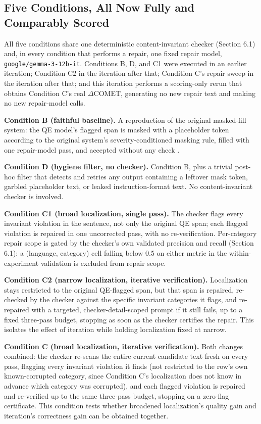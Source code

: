 \documentclass[11pt,letterpaper]{article}
\begin{document}
\subsection{Five Conditions, All Now Fully and Comparably Scored}

All five conditions share one deterministic content-invariant checker (Section 6.1) and, in every condition that performs a repair, one fixed repair model, \texttt{google/gemma-3-12b-it}. Conditions B, D, and C1 were executed in an earlier iteration; Condition C2 in the iteration after that; Condition C's repair sweep in the iteration after that; and this iteration performs a scoring-only rerun that obtains Condition C's real $\Delta$COMET, generating no new repair text and making no new repair-model calls.

\textbf{Condition B (faithful baseline).} A reproduction of the original masked-fill system: the QE model's flagged span is masked with a placeholder token according to the original system's severity-conditioned masking rule, filled with one repair-model pass, and accepted without any check \citep{Padmanabhan2025}.

\textbf{Condition D (hygiene filter, no checker).} Condition B, plus a trivial post-hoc filter that detects and retries any output containing a leftover mask token, garbled placeholder text, or leaked instruction-format text. No content-invariant checker is involved.

\textbf{Condition C1 (broad localization, single pass).} The checker flags every invariant violation in the sentence, not only the original QE span; each flagged violation is repaired in one uncorrected pass, with no re-verification. Per-category repair scope is gated by the checker's own validated precision and recall (Section 6.1): a (language, category) cell falling below 0.5 on either metric in the within-experiment validation is excluded from repair scope.

\textbf{Condition C2 (narrow localization, iterative verification).} Localization stays restricted to the original QE-flagged span, but that span is repaired, re-checked by the checker against the specific invariant categories it flags, and re-repaired with a targeted, checker-detail-scoped prompt if it still fails, up to a fixed three-pass budget, stopping as soon as the checker certifies the repair. This isolates the effect of iteration while holding localization fixed at narrow.

\textbf{Condition C (broad localization, iterative verification).} Both changes combined: the checker re-scans the entire current candidate text fresh on every pass, flagging every invariant violation it finds (not restricted to the row's own known-corrupted category, since Condition C's localization does not know in advance which category was corrupted), and each flagged violation is repaired and re-verified up to the same three-pass budget, stopping on a zero-flag certificate. This condition tests whether broadened localization's quality gain and iteration's correctness gain can be obtained together.
\end{document}
